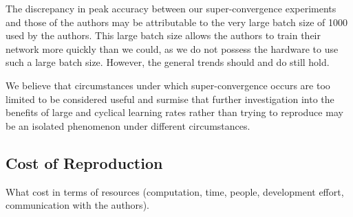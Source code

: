 \documentclass[10pt,twocolumn,letterpaper]{article}
\begin{document}
The discrepancy in peak accuracy between our super-convergence experiments and
those of the authors may be attributable to the very large batch size of 1000
used by the authors. This large batch size allows the authors to train their
network more quickly than we could, as we do not possess the hardware to use
such a large batch size. However, the general trends should and do still hold.

We believe that circumstances under which super-convergence occurs are too
limited to be considered useful and surmise that further investigation into the
benefits of large and cyclical learning rates rather than trying to reproduce
may be an isolated phenomenon under different circumstances.

\subsection{Cost of Reproduction}
What cost in terms of resources (computation, time, people, development effort, communication with the authors).

{\small


}
\end{document}
